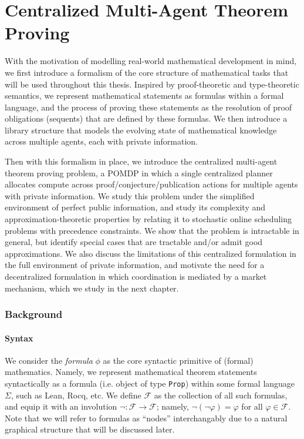 \chapter{Centralized Multi-Agent Theorem Proving}\label{chap:centralized}

\newcommand{\proves}{\vdash}




With the motivation of modelling real-world mathematical development in mind, we first introduce a formalism of the core structure of mathematical tasks that will be used throughout this thesis. Inspired by proof-theoretic and type-theoretic semantics, we represent mathematical statements as formulas within a formal language, and the process of proving these statements as the resolution of proof obligations (sequents) that are defined by these formulas. We then introduce a library structure that models the evolving state of mathematical knowledge across multiple agents, each with private information.

Then with this formalism in place, we introduce the centralized multi-agent theorem proving problem, a POMDP in which a single centralized planner allocates compute across proof/conjecture/publication actions for multiple agents with private information. We study this problem under the simplified environment of perfect public information, and study its complexity and approximation-theoretic properties by relating it to stochastic online scheduling problems with precedence constraints. We show that the problem is intractable in general, but identify special cases that are tractable and/or admit good approximations. We also discuss the limitations of this centralized formulation in the full environment of private information, and motivate the need for a decentralized formulation in which coordination is mediated by a market mechanism, which we study in the next chapter.


\subsection{Background}

\subsubsection{Syntax}

We consider the \textit{formula} $\phi$ as the core syntactic primitive of (formal) mathematics. Namely, we represent mathematical theorem statements syntactically as a formula (i.e. object of type \texttt{Prop}) within some formal language $\Sigma$, such as Lean, Rocq, etc. We define $\mathcal{F}$ as the collection of all such formulas, and equip it with an involution $\lnot : \mathcal{F}\rightarrow \mathcal{F}$; namely, $\lnot(\lnot\varphi)=\varphi$ for all $\varphi\in\mathcal{F}$. Note that we will refer to formulas as ``nodes'' interchangably due to a natural graphical structure that will be discussed later.


